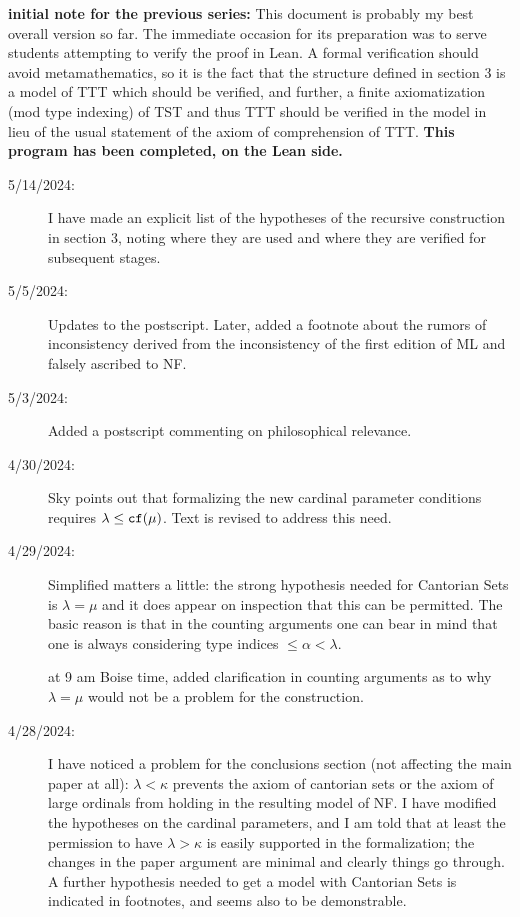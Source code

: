 \documentclass[112pt]{article}
\begin{document}
{\bf initial note for the previous series:}  This document is probably my best overall version so far.  The immediate occasion for its preparation was to serve students attempting to verify the proof in Lean.  A formal verification should avoid metamathematics, so it is the fact that the structure defined in section 3 is a model of TTT which should be verified, and further, a finite axiomatization (mod type indexing) of TST and thus TTT should be verified in the model in lieu of the usual statement of the axiom of comprehension of TTT.  {\bf This program has been completed, on the Lean side.}
\begin{description}

\item[5/14/2024:]  I have made an explicit list of the hypotheses of the recursive construction in section 3, noting where they are used and where they are verified for subsequent stages.

\item[5/5/2024:]  Updates to the postscript.  Later, added a footnote about the rumors of inconsistency derived from the inconsistency of the first edition of ML and falsely ascribed to NF.

\item[5/3/2024:]  Added a postscript commenting on philosophical relevance.

\item[4/30/2024:]  Sky points out that formalizing the new cardinal parameter conditions requires $\lambda \leq {\tt cf}(\mu)$.
Text is revised to address this need.

\item[4/29/2024:]  Simplified matters a little:  the strong hypothesis needed for Cantorian Sets is $\lambda=\mu$
and it does appear on inspection that this can be permitted.  The basic reason is that in the counting arguments one can bear in mind that one is always considering type indices $\leq \alpha < \lambda$.

at 9 am Boise time, added clarification in counting arguments as to why $\lambda=\mu$ would not be a problem for the construction.

\item[4/28/2024:]  I have noticed a problem for the conclusions section (not affecting the main paper at all):  $\lambda <\kappa$ prevents the axiom of cantorian sets or the axiom of large ordinals from holding in the resulting model of NF.   I have modified the hypotheses on the cardinal parameters, and I am told that at least the permission to have $\lambda>\kappa$ is easily supported in the formalization;  the changes in the paper argument are minimal and clearly things go through.  A further hypothesis needed to get a model with Cantorian Sets is indicated in footnotes, and seems also to be demonstrable.


\end{description}
\end{document}
